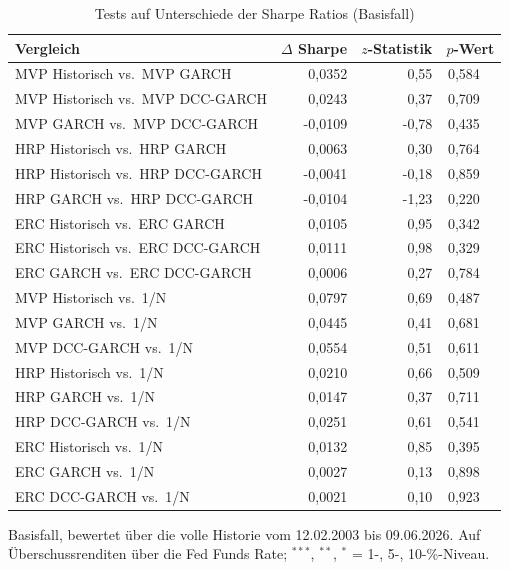 \begin{table}[htbp]
  \centering
  \footnotesize
  \begin{tabular}{lrrr@{}l}
    \toprule
    Vergleich & $\Delta$ Sharpe & $z$-Statistik & \multicolumn{2}{c}{$p$-Wert} \\
    \midrule
    MVP Historisch vs.\ MVP GARCH & 0,0352 & 0,55 & 0,584 &  \\
    MVP Historisch vs.\ MVP DCC-GARCH & 0,0243 & 0,37 & 0,709 &  \\
    MVP GARCH vs.\ MVP DCC-GARCH & -0,0109 & -0,78 & 0,435 &  \\
    HRP Historisch vs.\ HRP GARCH & 0,0063 & 0,30 & 0,764 &  \\
    HRP Historisch vs.\ HRP DCC-GARCH & -0,0041 & -0,18 & 0,859 &  \\
    HRP GARCH vs.\ HRP DCC-GARCH & -0,0104 & -1,23 & 0,220 &  \\
    ERC Historisch vs.\ ERC GARCH & 0,0105 & 0,95 & 0,342 &  \\
    ERC Historisch vs.\ ERC DCC-GARCH & 0,0111 & 0,98 & 0,329 &  \\
    ERC GARCH vs.\ ERC DCC-GARCH & 0,0006 & 0,27 & 0,784 &  \\
    MVP Historisch vs.\ 1/N & 0,0797 & 0,69 & 0,487 &  \\
    MVP GARCH vs.\ 1/N & 0,0445 & 0,41 & 0,681 &  \\
    MVP DCC-GARCH vs.\ 1/N & 0,0554 & 0,51 & 0,611 &  \\
    HRP Historisch vs.\ 1/N & 0,0210 & 0,66 & 0,509 &  \\
    HRP GARCH vs.\ 1/N & 0,0147 & 0,37 & 0,711 &  \\
    HRP DCC-GARCH vs.\ 1/N & 0,0251 & 0,61 & 0,541 &  \\
    ERC Historisch vs.\ 1/N & 0,0132 & 0,85 & 0,395 &  \\
    ERC GARCH vs.\ 1/N & 0,0027 & 0,13 & 0,898 &  \\
    ERC DCC-GARCH vs.\ 1/N & 0,0021 & 0,10 & 0,923 &  \\
    \bottomrule
  \end{tabular}
  \caption{Tests auf Unterschiede der Sharpe Ratios (Basisfall)}
  \label{tab:jobson_korkie}
  \begin{minipage}{\linewidth}\vspace{0.4em}\centering\footnotesize
  Basisfall, bewertet über die volle Historie vom 12.02.2003 bis 09.06.2026. Auf Überschussrenditen über die Fed Funds Rate; $^{***}$, $^{**}$, $^{*}$ = 1-, 5-, 10-\%-Niveau.
  \end{minipage}
\end{table}
